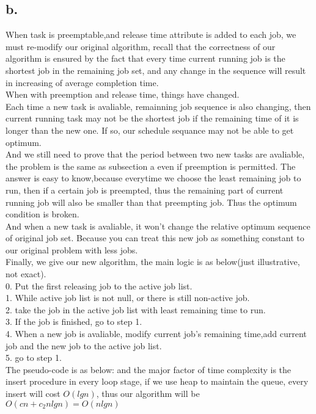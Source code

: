 \documentclass[oneside]{homework} %
\begin{document}
\subsection*{b.}
When task is preemptable,and release time attribute is added to each job, we must re-modify our original algorithm, recall that the correctness of our algorithm is ensured by the fact that every time current running job is the shortest job in the remaining job set, and any change in the sequence will result in increasing of average completion time.
\\When with preemption and release time, things have changed.\\ 
Each time a new task is avaliable, remainning job sequence is also changing, then current running task may not be the shortest job if the remaining time of it is longer than the new one. If so, our schedule sequance may not be able to get optimum. \\
And we still need to prove that the period between two new tasks are avaliable, the problem is the same as subsection a even if preemption is permitted. The answer is easy to know,because everytime we choose the least remaining job to run, then if a certain job is preempted, thus the remaining part of current running job will also be smaller than that preempting job. Thus the optimum condition is broken. \\  
And when a new task is avaliable, it won't change the relative optimum sequence of original job set. Because you can treat this new job as something constant to our original problem with less jobs. \\ 
Finally, we give our new algorithm, the main logic is as below(just illustrative, not exact).
\\ 0. Put the first releasing job to the active job list.
\\ 1. While active job list is not null, or there is still non-active job.
\\ 2. take the job in the active job list with least remaining time to run. 
\\ 3. If the job is finished, go to step 1.
\\ 4. When a new job is avaliable, modify current job's remaining time,add current job and the new job to the active job list.
\\ 5. go to step 1. 
\\ The pseudo-code is as below: and the major factor of time complexity is the insert procedure in every loop stage, if we use heap to maintain the queue, every insert will cost $O(lgn)$, thus our algorithm will be $O(cn+c_{2}nlgn) = O(nlgn)$ 
\end{document}
